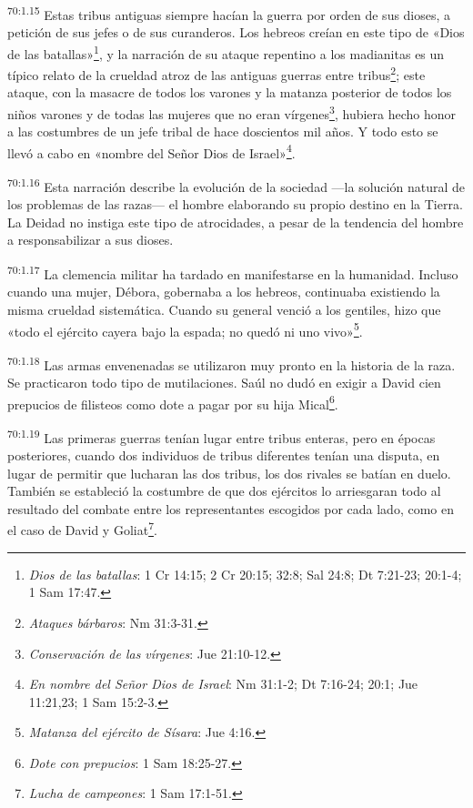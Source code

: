 \par
\textsuperscript{70:1.15} Estas tribus antiguas siempre hacían la guerra por orden de sus dioses, a petición de sus jefes o de sus curanderos. Los hebreos creían en este tipo de «Dios de las batallas»\footnote{\textit{Dios de las batallas}: 1 Cr 14:15; 2 Cr 20:15; 32:8; Sal 24:8; Dt 7:21-23; 20:1-4; 1 Sam 17:47.}, y la narración de su ataque repentino a los madianitas es un típico relato de la crueldad atroz de las antiguas guerras entre tribus\footnote{\textit{Ataques bárbaros}: Nm 31:3-31.}; este ataque, con la masacre de todos los varones y la matanza posterior de todos los niños varones y de todas las mujeres que no eran vírgenes\footnote{\textit{Conservación de las vírgenes}: Jue 21:10-12.}, hubiera hecho honor a las costumbres de un jefe tribal de hace doscientos mil años. Y todo esto se llevó a cabo en «nombre del Señor Dios de Israel»\footnote{\textit{En nombre del Señor Dios de Israel}: Nm 31:1-2; Dt 7:16-24; 20:1; Jue 11:21,23; 1 Sam 15:2-3.}.

\par
\textsuperscript{70:1.16} Esta narración describe la evolución de la sociedad ---la solución natural de los problemas de las razas--- el hombre elaborando su propio destino en la Tierra. La Deidad no instiga este tipo de atrocidades, a pesar de la tendencia del hombre a responsabilizar a sus dioses.

\par
\textsuperscript{70:1.17} La clemencia militar ha tardado en manifestarse en la humanidad. Incluso cuando una mujer, Débora, gobernaba a los hebreos, continuaba existiendo la misma crueldad sistemática. Cuando su general venció a los gentiles, hizo que «todo el ejército cayera bajo la espada; no quedó ni uno vivo»\footnote{\textit{Matanza del ejército de Sísara}: Jue 4:16.}.

\par
\textsuperscript{70:1.18} Las armas envenenadas se utilizaron muy pronto en la historia de la raza. Se practicaron todo tipo de mutilaciones. Saúl no dudó en exigir a David cien prepucios de filisteos como dote a pagar por su hija Mical\footnote{\textit{Dote con prepucios}: 1 Sam 18:25-27.}.

\par
\textsuperscript{70:1.19} Las primeras guerras tenían lugar entre tribus enteras, pero en épocas posteriores, cuando dos individuos de tribus diferentes tenían una disputa, en lugar de permitir que lucharan las dos tribus, los dos rivales se batían en duelo. También se estableció la costumbre de que dos ejércitos lo arriesgaran todo al resultado del combate entre los representantes escogidos por cada lado, como en el caso de David y Goliat\footnote{\textit{Lucha de campeones}: 1 Sam 17:1-51.}.


